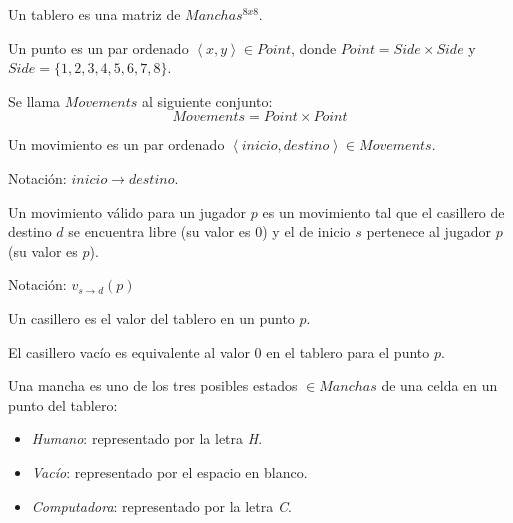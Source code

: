 \documentclass[10pt,a4paper,notitlepage]{article}
\newenvironment{definition}[1][Definición]{\begin{trivlist}
\item[\hskip \labelsep {\bfseries #1}]}{\end{trivlist}}
\begin{document}
\begin{definition}Un tablero es una matriz de $Manchas^{8x8}$.\end{definition}

\begin{definition}
Un punto es un par ordenado $\left\langle x, y\right\rangle \in Point$, donde $Point = Side \times Side$ y $Side = \{1, 2, 3, 4, 5, 6, 7, 8\}$.
\end{definition}

\begin{definition}
Se llama $Movements$ al siguiente conjunto:
\begin{equation}
Movements = Point \times Point
\end{equation}
\end{definition}

\begin{definition}
Un movimiento es un par ordenado $\left\langle inicio, destino\right\rangle \in Movements$.

Notación: $inicio \rightarrow destino$.
\end{definition}

\begin{definition}
Un movimiento válido para un jugador $p$ es un movimiento tal que el casillero de destino $d$ se encuentra libre (su valor es $0$) y el de inicio $s$ pertenece al jugador $p$ (su valor es $p$).

Notación: $v_{s \rightarrow d}(p)$
\end{definition}

\begin{definition}
Un casillero es el valor del tablero en un punto $p$.
\end{definition}

\begin{definition}
El casillero vacío es equivalente al valor $0$ en el tablero para el punto $p$.
\end{definition}

\begin{definition}
Una mancha es uno de los tres posibles estados $\in Manchas$ de una celda en un punto del tablero:
\begin{itemize}
\item[-1] \emph{Humano}: representado por la letra \textit{H}.
\item[0] \emph{Vacío}: representado por el espacio en blanco.
\item[1] \emph{Computadora}: representado por la letra \textit{C}.
\end{itemize}
\end{definition}
\end{document}

